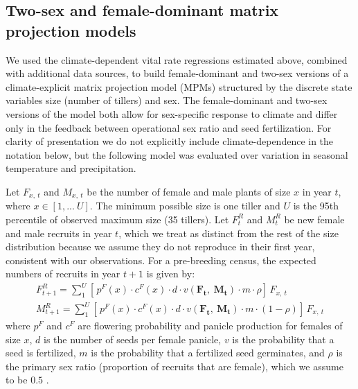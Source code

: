 \documentclass[12pt]{article}\usepackage[]{graphicx}\usepackage[dvipsnames]{xcolor}
\begin{document}
\subsection*{Two-sex and female-dominant matrix projection models}
We used the climate-dependent vital rate regressions estimated above, combined with additional data sources, to build female-dominant and two-sex versions of a climate-explicit matrix projection model (MPMs) structured by the discrete state variables size (number of tillers) and sex.
The female-dominant and two-sex versions of the model both allow for sex-specific response to climate and differ only in the feedback between operational sex ratio and seed fertilization. 
For clarity of presentation we do not explicitly include climate-dependence in the notation below, but the following model was evaluated over variation in seasonal temperature and precipitation. 

Let $F_{x,\ t}$ and $M_{x,\ t}$ be the number of female and male plants of size $x$ in year $t$, where $x \in [1,...\ U]$.
The minimum possible size is one tiller and $U$ is the 95th percentile of observed maximum size (35 tillers).
Let $F^{R}_{t}$ and $M^{R}_{t}$ be new female and male recruits in year $t$, which we treat as distinct from the rest of the size distribution because we assume they do not reproduce in their first year, consistent with our observations.
For a pre-breeding census, the expected numbers of recruits in year $t+1$ is given by:
\begin{align}\label{eq:recruits}
F^{R}_{t+1} = \sum_{1}^{U} 	[ \, p^{F}(x) \cdot c^{F}(x) \cdot d \cdot v(\mathbf{F_{t}},\ \mathbf{M_{t}}) \cdot m \cdot \rho 	] \, F_{x,\ t}
\\
M^{R}_{t+1} = \sum_{1}^{U} 	[ \, p^{F}(x) \cdot c^{F}(x) \cdot d \cdot v(\mathbf{F_{t}},\ \mathbf{M_{t}}) \cdot m \cdot (1-\rho) 	] \, F_{x,\ t}
\end{align}
\noindent where $p^{F}$ and $c^{F}$ are flowering probability and panicle production for females of size $x$, $d$ is the number of seeds per female panicle, $v$ is the probability that a seed is fertilized, $m$ is the probability that a fertilized seed germinates, and $\rho$ is the primary sex ratio (proportion of recruits that are female), which we assume to be $0.5$ \citep{miller2022two}. 
\end{document}
